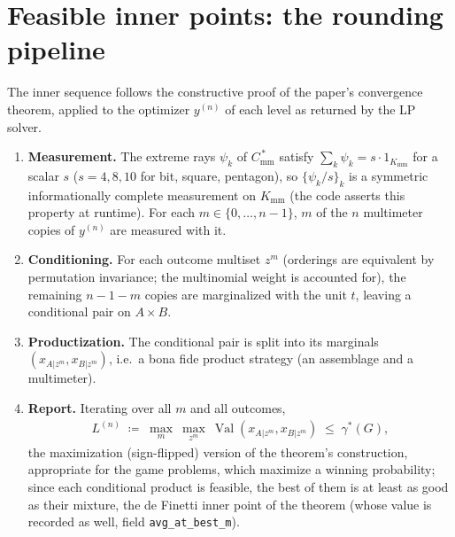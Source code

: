 \documentclass[11pt,a4paper]{article}
\newcommand*{\lrbracket}[1]{\left(#1\right)}
\DeclareMathOperator{\Val}{Val}
\newcommand*{\Kmm}{K_{\mathrm{mm}}}
\newcommand*{\Cmm}{C_{\mathrm{mm}}}
\newcommand*{\code}[1]{\texttt{#1}}
\theoremstyle{remark}
\begin{document}
\section{Feasible inner points: the rounding pipeline}\label{sec:rounding}

The inner sequence follows the constructive proof of the paper's
convergence theorem, applied to the optimizer $y^{(n)}$ of each level as
returned by the LP solver.

\begin{enumerate}[leftmargin=2em]
\item \textbf{Measurement.} The extreme rays $\psi_k$ of $\Cmm^{\,*}$
satisfy $\sum_k \psi_k = s\cdot 1_{\Kmm}$ for a scalar $s$ ($s=4, 8, 10$
for bit, square, pentagon), so $\lbrace \psi_k/s\rbrace_k$ is a symmetric
informationally complete measurement on $\Kmm$ (the code asserts this
property at runtime). For each $m\in\lbrace 0,\ldots,n-1\rbrace$, $m$ of the
$n$ multimeter copies of $y^{(n)}$ are measured with it.
\item \textbf{Conditioning.} For each outcome multiset $z^m$ (orderings
are equivalent by permutation invariance; the multinomial weight is
accounted for), the remaining $n-1-m$ copies are marginalized with the
unit $t$, leaving a conditional pair on $A\times B$.
\item \textbf{Productization.} The conditional pair is split into its
marginals $\lrbracket{x_{A\vert z^m}, x_{B\vert z^m}}$, i.e.\ a bona fide
product strategy (an assemblage and a multimeter).
\item \textbf{Report.} Iterating over all $m$ and all outcomes,
\begin{align}\label{eq:inner}
    L^{(n)}\;\coloneqq\;\max_{m}\ \max_{z^m}\
    \Val\lrbracket{x_{A\vert z^m}, x_{B\vert z^m}}\;\leq\;\gamma^*(G),
\end{align}
the maximization (sign-flipped) version of the theorem's construction,
appropriate for the game problems, which maximize a winning probability;
since each conditional product is feasible, the best of them is at least
as good as their mixture, the de Finetti inner point of the theorem (whose
value is recorded as well, field \code{avg\_at\_best\_m}).
\end{enumerate}
\end{document}
